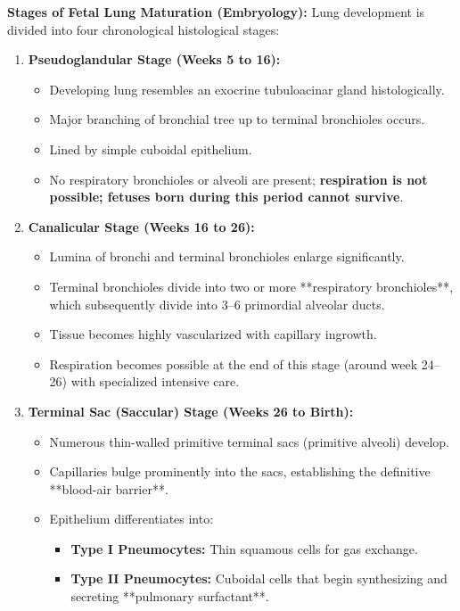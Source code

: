 \documentclass[11pt,a4paper]{article}
\begin{document}
\begin{ansbox}
\textbf{Stages of Fetal Lung Maturation (Embryology):}
Lung development is divided into four chronological histological stages:

\begin{enumerate}[leftmargin=*]
    \item \textbf{Pseudoglandular Stage (Weeks 5 to 16):}
    \begin{itemize}
        \item Developing lung resembles an exocrine tubuloacinar gland histologically.
        \item Major branching of bronchial tree up to terminal bronchioles occurs.
        \item Lined by simple cuboidal epithelium.
        \item No respiratory bronchioles or alveoli are present; \textbf{respiration is not possible; fetuses born during this period cannot survive}.
    \end{itemize}
    \item \textbf{Canalicular Stage (Weeks 16 to 26):}
    \begin{itemize}
        \item Lumina of bronchi and terminal bronchioles enlarge significantly.
        \item Terminal bronchioles divide into two or more **respiratory bronchioles**, which subsequently divide into 3--6 primordial alveolar ducts.
        \item Tissue becomes highly vascularized with capillary ingrowth.
        \item Respiration becomes possible at the end of this stage (around week 24--26) with specialized intensive care.
    \end{itemize}
    \item \textbf{Terminal Sac (Saccular) Stage (Weeks 26 to Birth):}
    \begin{itemize}
        \item Numerous thin-walled primitive terminal sacs (primitive alveoli) develop.
        \item Capillaries bulge prominently into the sacs, establishing the definitive **blood-air barrier**.
        \item Epithelium differentiates into:
        \begin{itemize}
            \item \textbf{Type I Pneumocytes:} Thin squamous cells for gas exchange.
            \item \textbf{Type II Pneumocytes:} Cuboidal cells that begin synthesizing and secreting **pulmonary surfactant**.

\end{itemize}
\end{itemize}
\end{enumerate}
\end{ansbox}
\end{document}
